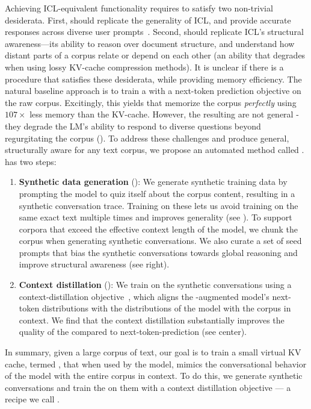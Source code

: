 
Achieving ICL-equivalent functionality requires \artifacts to satisfy two non-trivial desiderata. First, \artifacts should replicate the generality of ICL, and provide accurate responses across diverse user prompts~\cite{dong2022survey}.
Second, \artifacts should replicate ICL's  structural awareness---its ability to reason over document structure, and understand how distant parts of a corpus relate or depend on each other (an ability that degrades when using lossy KV-cache compression methods).
It is unclear if there is a procedure that satisfies these desiderata, while providing memory efficiency.
The natural baseline approach is to train a \artifact with a next-token prediction objective on the raw corpus. Excitingly, this yields \artifacts that memorize the corpus \textit{perfectly} using $107\times$ less memory than the KV-cache. However, the resulting \artifacts are not general - they degrade the LM's ability to respond to diverse questions beyond regurgitating the corpus ().
To address these challenges and produce general, structurally aware \artifacts for any text corpus, we propose an automated method called \method. \method has two steps:
\begin{enumerate}[leftmargin=*]
    \item \textbf{Synthetic data generation} (): We generate synthetic training data by prompting the model to quiz itself about the corpus content, resulting in a synthetic conversation trace. Training on these lets us avoid training on the same exact text multiple times and improves generality (see ).
To support corpora that exceed the effective context length of the model, we chunk the corpus when generating synthetic conversations.
We also curate a set of seed prompts that bias the synthetic conversations towards global reasoning and improve structural awareness (see  right).
    \item \textbf{Context distillation} (): We train on the synthetic conversations using a context-distillation objective~\cite{bhargava2024prompt,snell2022learning}, which aligns the \artifact-augmented model's next-token distributions with the distributions of the model with the corpus in context. We find that the context distillation substantially improves the quality of the \artifacts compared to next-token-prediction (see  center).
\end{enumerate}
In summary, given a large corpus of text, our goal is to train a small virtual KV cache, termed \artifact, that when used by the model, mimics the conversational behavior of the model with the entire corpus in context. To do this, we generate synthetic conversations and train the \artifact on them with a context distillation objective --- a recipe we call \method.
